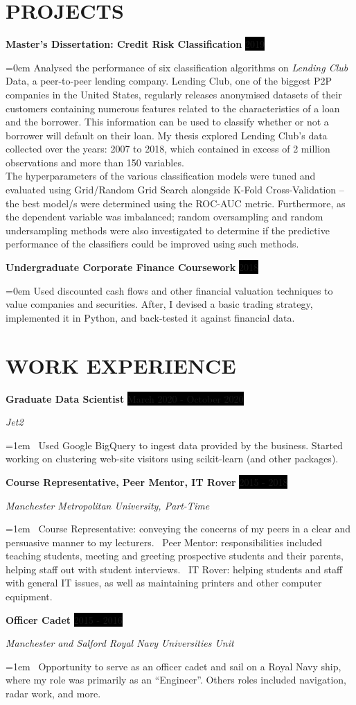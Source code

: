 \documentclass[paper=a4,fontsize=11pt]{scrartcl}
\newcommand{\sepspace}{\vspace*{1em}}
\newcommand{\NewPart}[1]{\section*{\uppercase{#1}}}
\newcommand{\WorkEntry}[4]{
		\noindent \textbf{#1} \hfill
		\colorbox{Black}{\color{White}#2} \par
		\noindent \textit{#3} \par
		\noindent\hangindent=1em\hangafter=0 \small #4
		\normalsize \par}
\newcommand{\RandomEntry}[4]{
		\noindent  \textbf{#1} \hfill
		\colorbox{Black}{\color{White}#2} \par
		\noindent \textit{#3} \par
		\noindent\hangindent=0em\hangafter=0 \small #4
		\normalsize \par}
\begin{document}
\NewPart{Projects}{}

\RandomEntry{Master's Dissertation: Credit Risk Classification}{2019}{}
{Analysed the performance of six classification algorithms on \textit{Lending Club} Data, a peer-to-peer lending company. Lending Club, one of the biggest P2P companies in the United States, regularly releases anonymised datasets of their customers containing numerous features related to the characteristics of a loan and the borrower. This information can be used to classify whether or not a borrower will default on their loan. My thesis explored Lending Club's data collected over the years: 2007 to 2018, which contained in excess of 2 million observations and more than 150 variables.\\

\noindent The hyperparameters of the various classification models were tuned and evaluated using Grid/Random Grid Search alongside K-Fold Cross-Validation -- the best model/s were determined using the ROC-AUC metric. Furthermore, as the dependent variable was imbalanced; random oversampling and random undersampling methods were also investigated to determine if the predictive performance of the classifiers could be improved using such methods.}

\sepspace

\RandomEntry{Undergraduate Corporate Finance Coursework}{2018}{}{Used discounted cash flows and other financial valuation techniques to value companies and securities. After, I devised a basic trading strategy, implemented it in Python, and back-tested it against financial data.}


\NewPart{Work Experience}{}

\WorkEntry{Graduate Data Scientist}
{March 2020 - October 2020}
{Jet2}
{\textbullet\ Used Google BigQuery to ingest data provided by the business. Started working on clustering web-site visitors using scikit-learn (and other packages).}

\sepspace

\WorkEntry{Course Representative, Peer Mentor, IT Rover}
{2015 - 2018}
{Manchester Metropolitan University, Part-Time}
{\textbullet\ Course Representative: conveying the concerns of my peers in a clear and persuasive manner to my lecturers. \newline 
\textbullet\ Peer Mentor: responsibilities included teaching students, meeting and greeting prospective students and their parents, helping staff out with student interviews. \newline 
\textbullet\ IT Rover: helping students and staff with general IT issues, as well as maintaining printers and other computer equipment.}

\sepspace

\WorkEntry
{Officer Cadet}
{2015 - 2016}
{Manchester and Salford Royal Navy Universities Unit}
{\textbullet\ Opportunity to serve as an officer cadet and sail on a Royal Navy ship, where my role was primarily as an “Engineer”. Others roles included navigation, radar work, and more.}
\end{document}
